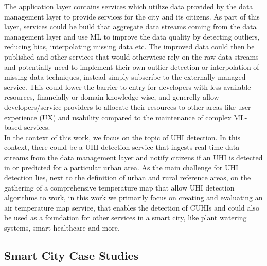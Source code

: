 The application layer contains services which utilize data provided by the data management layer to provide services for the city and its citizens. As part of this layer, services could be build that aggregate data streams coming from the data management layer and use ML to improve the data quality by detecting outliers, reducing bias, interpolating missing data etc. The improved data could then be published and other services that would otherwiese rely on the raw data streams and potentially need to implement their own outlier detection or interpolation of missing data techniques, instead simply subscribe to the externally managed service. This could lower the barrier to entry for developers with less available resources, financially or domain-knowledge wise, and generelly allow developers/service providers to allocate their resources to other areas like user experience (UX) and usability compared to the maintenance of complex ML-based services.\\
In the context of this work, we focus on the topic of UHI detection. In this context, there could be a UHI detection service that ingests real-time data streams from the data management layer and notify citizens if an UHI is detected in or predicted for a particular urban area. As the main challenge for UHI detection lies, next to the definition of urban and rural reference areas, on the gathering of a comprehensive temperature map that allow UHI detection algorithms to work, in this work we primarily focus on creating and evaluating an air temperature map service, that enables the detection of CUHIs and could also be used as a foundation for other services in a smart city, like plant watering systems, smart healthcare and more.

\subsection{Smart City Case Studies}
\label{sec: smart city case studies}

